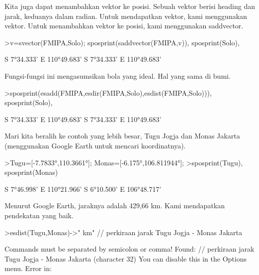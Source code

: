\documentclass{article}
\begin{document}
\begin{eulernotebook}
\begin{eulercomment}
\begin{eulercomment}
\begin{eulercomment}
\begin{eulercomment}
\begin{euleroutput}
\end{euleroutput}
\begin{eulercomment}
Kita juga dapat menambahkan vektor ke posisi. Sebuah vektor berisi
heading dan jarak, keduanya dalam radian. Untuk mendapatkan vektor,
kami menggunakan vektor. Untuk menambahkan vektor ke posisi, kami
menggunakan saddvector.
\end{eulercomment}
\begin{eulerprompt}
>v=svector(FMIPA,Solo); sposprint(saddvector(FMIPA,v)), sposprint(Solo),
\end{eulerprompt}
\begin{euleroutput}
  S 7°34.333' E 110°49.683'
  S 7°34.333' E 110°49.683'
\end{euleroutput}
\begin{eulercomment}
Fungsi-fungsi ini mengasumsikan bola yang ideal. Hal yang sama di
bumi.
\end{eulercomment}
\begin{eulerprompt}
>sposprint(esadd(FMIPA,esdir(FMIPA,Solo),esdist(FMIPA,Solo))), sposprint(Solo),
\end{eulerprompt}
\begin{euleroutput}
  S 7°34.333' E 110°49.683'
  S 7°34.333' E 110°49.683'
\end{euleroutput}
\begin{eulercomment}
Mari kita beralih ke contoh yang lebih besar, Tugu Jogja dan Monas
Jakarta (menggunakan Google Earth untuk mencari koordinatnya).
\end{eulercomment}
\begin{eulerprompt}
>Tugu=[-7.7833°,110.3661°]; Monas=[-6.175°,106.811944°];
>sposprint(Tugu), sposprint(Monas)
\end{eulerprompt}
\begin{euleroutput}
  S 7°46.998' E 110°21.966'
  S 6°10.500' E 106°48.717'
\end{euleroutput}
\begin{eulercomment}
Menurut Google Earth, jaraknya adalah 429,66 km. Kami mendapatkan
pendekatan yang baik.
\end{eulercomment}
\begin{eulerprompt}
>esdist(Tugu,Monas)->" km" // perkiraan jarak Tugu Jogja - Monas Jakarta
\end{eulerprompt}
\begin{euleroutput}
  Commands must be separated by semicolon or comma!
  Found:  // perkiraan jarak Tugu Jogja - Monas Jakarta (character 32)
  You can disable this in the Options menu.
  Error in:

\end{euleroutput}
\end{eulercomment}
\end{eulercomment}
\end{eulercomment}
\end{eulercomment}
\end{eulernotebook}
\end{document}
